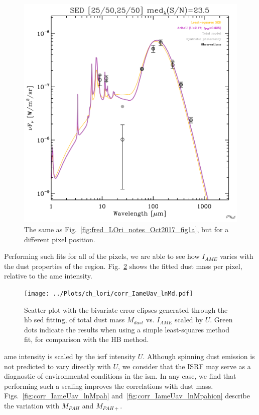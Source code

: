               \begin{figure}
                \includegraphics[width=\textwidth]{../Plots/ch_lori/fred_LOri_notes_Oct2017_fig1b.pdf}
                \centering
                \caption{The same as Fig.~\ref{fig:fred_LOri_notes_Oct2017_fig1a}, but for a different pixel position.}
                \label{fig:fred_LOri_notes_Oct2017_fig1b}
              \end{figure}
           Performing such fits for all of the pixels, we are able to see how $I_{AME}$ varies with the dust properties of the region. Fig.~\ref{fig:corr_IameUav_lnMd} shows the fitted dust mass per pixel, relative to the \acrshort{ame} intensity.
                \begin{figure}
                 \texttt{[image: ../Plots/ch\_lori/corr\_IameUav\_lnMd.pdf]}
                 \centering
                 \caption{Scatter plot with the bivariate error elipses generated through the \acrshort{hb} \acrshort{sed} fitting, of total dust mass $M_{dust}$ vs. $I_{AME}$ scaled by $U$. Green dots indicate the results when using a simple least-squares method fit, for comparison with the HB method.}
                 \label{fig:corr_IameUav_lnMd}
               \end{figure}
           \acrshort{ame} intensity is scaled by the \acrshort{isrf} intensity $U$. Although spinning dust emission is not predicted to vary directly with $U$, we consider that the ISRF may serve as a diagnostic of environmental conditions in the \acrshort{ism}. In any case, we find that performing such a scaling improves the correlations with dust mass.   Figs.~\ref{fig:corr_IameUav_lnMpah} and~\ref{fig:corr_IameUav_lnMpahion} describe the variation with $M_{PAH}$ and $M_{PAH+}$.
